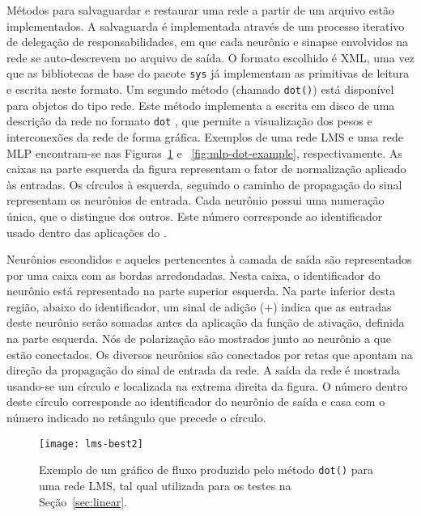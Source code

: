 Métodos para salvaguardar e restaurar uma rede a partir de um arquivo es\-tão
implementados. A salvaguarda é implementada através de um processo iterativo
de delegação de responsabilidades, em que cada neurônio e sinapse envolvidos na
rede se auto-descrevem no arquivo de saída. O formato escolhido é XML, uma vez
que as bibliotecas de base do pacote \texttt{sys} já implementam as primitivas
de leitura e escrita neste formato. Um segundo método (chamado \texttt{dot()})
está disponível para objetos do tipo rede. Este método implementa a
escrita em disco de uma descrição da rede no formato \texttt{dot}
\cite{graphviz}, que permite a visualização dos pesos e interconexões da rede
de forma gráfica. Exemplos de uma rede LMS e uma rede MLP encontram-se nas
Figuras~\ref{fig:lms-dot-example} e ~\ref{fig:mlp-dot-example},
respectivamente. As caixas na parte esquerda da figura representam o fator de
normalização aplicado às entradas. Os círculos à esquerda, seguindo o caminho
de propagação do sinal representam os neurônios de entrada. Cada neurônio
possui uma numeração única, que o distingue dos outros. Este número
corresponde ao identificador usado dentro das aplicações do
. 

Neurônios escondidos e aqueles pertencentes à camada de saída são
representados por uma caixa com as bordas arredondadas. Nesta caixa, o
identificador do neurônio está representado na parte superior esquerda. Na
parte inferior desta região, abaixo do identificador, um sinal de adição ($+$)
indica que as entradas deste neurônio serão somadas antes da aplicação da
função de ativação, definida na parte esquerda. Nós de polarização são
mostrados junto ao neurônio a que estão conectados. Os diversos neurônios são
conectados por retas que apontam na direção da propagação do sinal de entrada
da rede. A saída da rede é mostrada usando-se um círculo e localizada na
extrema direita da figura. O número dentro deste círculo corresponde ao
identificador do neurônio de saída e casa com o número indicado no retângulo que
precede o círculo.

\begin{figure}
\begin{center}
\texttt{[image: lms-best2]}
\end{center}
\caption{Exemplo de um gráfico de fluxo produzido pelo método \texttt{dot()}
para uma rede LMS, tal qual utilizada para os testes na
Seção~\ref{sec:linear}.}
\label{fig:lms-dot-example}
\end{figure}

